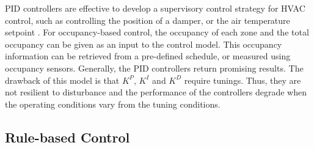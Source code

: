 PID controllers are effective to develop a supervisory control strategy for HVAC control, such as controlling the position of a damper, or the air temperature setpoint \citep{xu2009model}. For occupancy-based control, the occupancy of each zone and the total occupancy can be given as an input to the control model. This occupancy information can be retrieved from a pre-defined schedule, or measured using occupancy sensors. Generally, the PID controllers return promising results. The drawback of this model is that $K^P$, $K^I$ and $K^D$ require tunings. Thus, they are not resilient to disturbance and the performance of the controllers degrade when the operating conditions vary from the tuning conditions.

\subsection{Rule-based Control}

